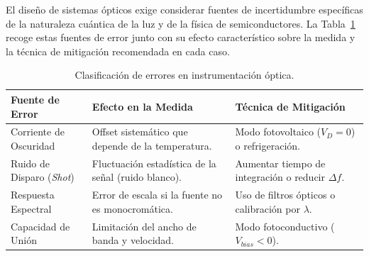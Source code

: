 El diseño de sistemas ópticos exige considerar fuentes de incertidumbre específicas de la naturaleza cuántica de la luz y de la física de semiconductores. La Tabla~\ref{tab:errores_optica} recoge estas fuentes de error junto con su efecto característico sobre la medida y la técnica de mitigación recomendada en cada caso.

\begin{table}[ht]
    \centering
    \forcerectofloat %
    \caption[Clasificación de errores en instrumentación óptica.]{Clasificación de errores en instrumentación óptica.\protect\label{tab:errores_optica}}
    \begin{tabularx}{\linewidth}{@{} >{\centering\arraybackslash}X >{\centering\arraybackslash}X >{\centering\arraybackslash}X @{}}
        \toprule
        \textbf{Fuente de Error} & \textbf{Efecto en la Medida} & \textbf{Técnica de Mitigación} \\
        \midrule
        Corriente de Oscuridad & Offset sistemático que depende de la temperatura. & Modo fotovoltaico ($V_D=0$) o refrigeración. \\
        Ruido de Disparo (\textit{Shot}) & Fluctuación estadística de la señal (ruido blanco). & Aumentar tiempo de integración o reducir $\Delta f$. \\
        Respuesta Espectral & Error de escala si la fuente no es monocromática. & Uso de filtros ópticos o calibración por $\lambda$. \\
        Capacidad de Unión & Limitación del ancho de banda y velocidad. & Modo fotoconductivo ($V_{bias} < 0$). \\
        \bottomrule
    \end{tabularx}
    
\end{table}


